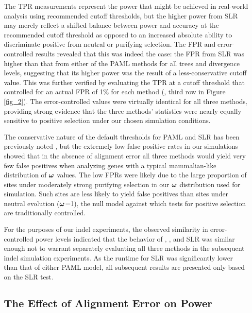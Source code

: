 \documentclass{article}
\begin{document}
The TPR measurements represent the power that might be achieved in
real-world analysis using recommended cutoff thresholds, but the
higher power from SLR may merely reflect a shifted balance between
power and accuracy at the recommended cutoff threshold as opposed to
an increased absolute ability to discriminate positive from neutral or
purifying selection. The FPR and error-controlled \tpr results
revealed that this was indeed the case: the FPR from SLR was higher
than that from either of the PAML methods for all trees and divergence
levels, suggesting that its higher power was the result of a
less-conservative cutoff value. This was further verified by
evaluating the TPR at a cutoff threshold that controlled for an actual
FPR of 1\% for each method (\tpr{}, third row in Figure
\ref{fig_2}). The error-controlled \tpr values were virtually
identical for all three methods, providing strong evidence that the
three methods' \sw statistics were nearly equally sensitive to
positive selection under our chosen simulation conditions.

The conservative nature of the default thresholds for PAML and SLR has
been previously noted
\citep{Anisimova2002Accuracy,Yang2005Bayes,Massingham2005Detecting},
but the extremely low false positive rates in our simulations showed
that in the absence of alignment error all three methods would yield
very few false positives when analyzing genes with a typical
mammalian-like distribution of $\bm{\omega}$ values. The low FPRs were likely
due to the large proportion of sites under moderately strong purifying
selection in our $\bm{\omega}$ distribution used for simulation. Such sites
are less likely to yield false positives than sites under neutral
evolution ($\bm{\omega}$=1), the null model against which tests for positive
selection are traditionally controlled.

For the purposes of our indel experiments, the observed similarity in
error-controlled power levels indicated that the behavior of \mtwo,
\meight, and SLR was similar enough not to warrant separately
evaluating all three methods in the subsequent indel simulation
experiments. As the runtime for SLR was significantly lower than that
of either PAML model, all subsequent results are presented only based
on the SLR test.

\subsection*{The Effect of Alignment Error on \Sw Power}
\end{document}

